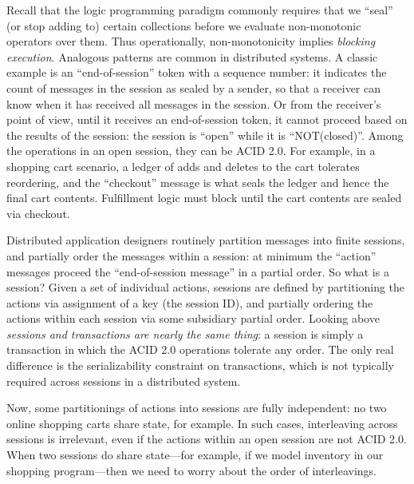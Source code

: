 \documentclass{sig-alternate}
\begin{document}

Recall that the logic programming paradigm commonly requires that we
``seal'' (or stop adding to) certain collections before we evaluate non-monotonic operators
over them.
Thus operationally, non-monotonicity implies \emph{blocking execution}. 
Analogous patterns are common in distributed systems.
A classic example
is an ``end-of-session'' token with a sequence number: it indicates the count of
messages in the session as sealed by a sender, so that a receiver can know when
it has received all messages in the session.  Or from the receiver's point of
view, until it receives an end-of-session token, it cannot proceed based on the
results of the session: the session is ``open'' while it is ``NOT(closed)''.
Among the operations in an open session, they can be ACID 2.0.  For example, in
a shopping cart scenario, a ledger of adds and deletes to the cart tolerates
reordering, and the ``checkout'' message is what seals the ledger and hence the
final cart contents.  Fulfillment logic must block until the cart contents are
sealed via checkout.

Distributed application designers routinely partition messages into finite
sessions, and partially order the messages within a session: at minimum the
``action'' messages proceed the ``end-of-session message'' in a partial order.
So what is a session?  Given a set of individual actions, sessions are defined
by partitioning the actions via assignment of a key (the session ID), and
partially ordering the actions within each session via some subsidiary partial
order.  Looking above \emph{sessions and transactions are nearly the same
  thing}: a session is simply a transaction in which the ACID 2.0 operations
tolerate any order.  The only real difference is the serializability constraint
on transactions, which is not typically required across sessions in a
distributed system.

Now, some partitionings of actions into sessions are fully independent: no two
online shopping carts share state, for example.  In such cases, interleaving
across sessions is irrelevant, even if the actions within an open session are
not ACID 2.0.  When two sessions do share state---for example, if we model
inventory in our shopping program---then we need to worry about the order of
interleavings.
\end{document}
